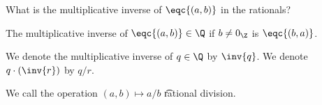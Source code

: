 

What is the multiplicative inverse of $\eqc{(a, b)}$ in the rationals?


\begin{proposition}
  The multiplicative inverse of $\eqc{(a, b)} \in \Q$ if $b \neq 0_{\Z}$ is $\eqc{(b,a)}$.
\end{proposition}


We denote the multiplicative inverse of $q \in \Q$ by $\inv{q}$.
We denote $q \cdot (\inv{r})$ by $q/r$.


We call the operation $(a, b) \mapsto a/b$ \t{rational division}.

\blankpage
